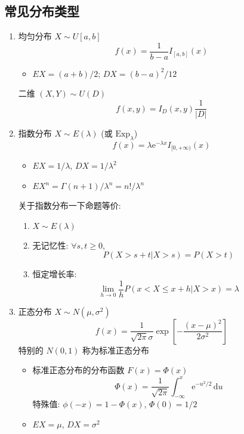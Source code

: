 \documentclass[11pt,a4paper,twocolumn]{article} %
\numberwithin{equation}{section} %
\newcommand{\dif}{\,\mathrm d}
\newcommand\e{\mathrm{e}} %
\begin{document}
\subsection{常见分布类型} %
\label{sub:dist_type_conti}
\begin{enumerate}
	\item 均匀分布 $X\sim U[a,b]$
	\begin{equation}
		f(x) = \frac{1}{b-a}I_{[a,b]}(x)
	\end{equation}
	\begin{itemize}
		\item $EX = (a+b)/2$; $DX = (b-a)^2/12$
	\end{itemize}
	二维 $(X, Y) \sim U(D)$
	\begin{equation}
		f(x, y) = I_D(x,y) \frac 1{|D|}
	\end{equation}
	\item 指数分布 $X\sim E(\lambda)$ (或 $\mathrm{Exp}_\lambda$)
	\begin{equation}
		f(x) = \lambda \e^{-\lambda x}I_{[0, +\infty)}(x)
	\end{equation}
	\begin{itemize}
		\item $EX = 1/\lambda$, $DX = 1/\lambda^2$
		\item $EX^n = \Gamma(n+1)/\lambda^n = n!/\lambda^n$
	\end{itemize}
	关于指数分布一下命题等价: 
	\begin{enumerate}
		\item $X\sim E(\lambda)$
		\item 无记忆性: $\forall s, t \ge 0$, 
		$$ P(X>s+t |X>s) = P(X>t) $$
		\item 恒定增长率: 
		$$\lim_{h\to 0} \frac 1h P(x<X\le x+h | X>x) = \lambda $$ 
	\end{enumerate}
	\item 正态分布 $X\sim N(\mu, \sigma^2)$
	\begin{equation}
		f(x) = \frac{1}{\sqrt{2\pi}\sigma}
		\exp\left[-\frac{(x-\mu)^2}{2\sigma^2}\right]
	\end{equation}
	特别的 $N(0, 1)$ 称为标准正态分布
	\begin{itemize}
		\item 标准正态分布的分布函数 $F(x) = \Phi(x)$
		\begin{equation}
			\Phi(x) = \frac{1}{\sqrt{2\pi}}\int_{-\infty}^x\e^{-u^2/2}\dif u
		\end{equation}
		特殊值: $\phi(-x) = 1-\Phi(x)$, $\Phi(0) = 1/2$
		\item $EX = \mu$, $DX = \sigma^2$

\end{itemize}
\end{enumerate}
\end{document}
